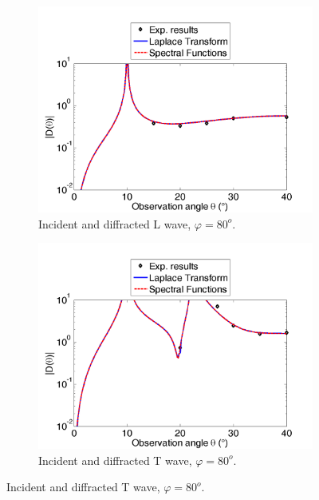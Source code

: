 \begin{figure}[h!]
\centering
    \begin{subfigure}[b]{0.45\textwidth}
        \includegraphics[width=\textwidth]{images/chapter3/Retrodiff_D_80_LL.png}
        \caption{Incident and diffracted L wave, $\varphi=80^o$.}
        \label{C3:DLL80}
    \end{subfigure}
    \hfill  
    \begin{subfigure}[b]{0.45\textwidth}
        \includegraphics[width=\textwidth]{images/chapter3/Retrodiff_D_80_TT.png}
        \caption{Incident and diffracted T wave, $\varphi=80^o$.}
        \label{C3:DTT80}
     \end{subfigure} %

\end{figure}
